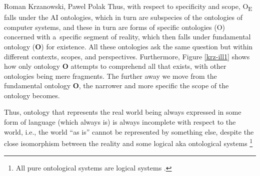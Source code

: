 \begin{artengenv2auth}{Roman Krzanowski, Pawel Polak}
Thus, with respect to specificity and scope, O\textsubscript{E} falls under the AI ontologies, which in turn are subspecies of the ontologies of computer systems, and these in turn are forms of specific ontologies (O) concerned with a~specific segment of reality, which then falls under fundamental ontology (\textbf{O}) for existence. All these ontologies ask the same question but within different contexts, scopes, and perspectives. Furthermore, Figure \ref{krz-ill1} shows how only ontology \textbf{O} attempts to comprehend all that exists, with other ontologies being mere fragments. The further away we move from the fundamental ontology \textbf{O}, the narrower and more specific the scope of the ontology becomes.

Thus, ontology that represents the real world being always expressed in some form of language (which always is) is always incomplete with respect to the world, i.e., the world ``as is'' cannot be represented by something else, despite the close isomorphism between the reality and some logical aka ontological systems \footnote{All pure ontological systems are logical systems
\parencites[][p.xiii]{jacquette_ontology_2002}[see, e.g.,][]{foschini_where_2013}.%
}


\end{artengenv2auth}